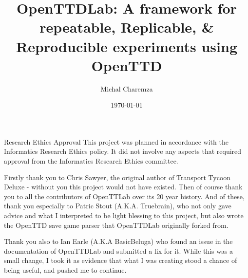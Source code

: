 \documentclass[logo,msc]{infthesis}           %
\begin{document}
\begin{preliminary}

\title{OpenTTDLab: A framework for repeatable, Replicable, \& Reproducible experiments using OpenTTD}

\author{Michal Charemza}

\date{\today}


\maketitle

\newenvironment{ethics}
   {\begin{frontenv}{Research Ethics Approval}{\LARGE}}
   {\end{frontenv}\newpage}

\begin{ethics}
This project was planned in accordance with the Informatics Research
Ethics policy. It did not involve any aspects that required approval
from the Informatics Research Ethics committee.

\standarddeclaration
\end{ethics}


\begin{acknowledgements}

Firstly thank you to Chris Sawyer, the original author of Transport Tycoon Deluxe - without you this project would not have existed. Then of course thank you to all the contributors of OpenTTLab over its 20 year history. And of these, thank you especially to Patric Stout (A.K.A. Truebrain), who not only gave advice and what I interpreted to be light blessing to this project, but also wrote the OpenTTD save game parser that OpenTTDLab originally forked from.

Thank you also to Ian Earle (A.K.A BasicBeluga) who found an issue in the documentation of OpenTTDLab and submitted a fix for it. While this was a small change, I took it as evidence that what I was creating stood a chance of being useful, and pushed me to continue.


\end{acknowledgements}
\end{preliminary}
\end{document}
